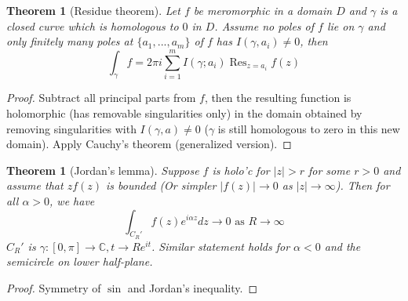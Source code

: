 \documentclass{article}
\theoremstyle{definition}
\theoremstyle{remark}
\theoremstyle{plain}
\newtheorem{thm}[defn]{Theorem}
\newcommand{\CC}{\mathbb{C}}
\begin{document}
\begin{thm}[Residue theorem]
    Let $f$ be meromorphic in a domain $D$ and $\gamma$ is a closed curve which is homologous to $0$ in $D$. Assume no poles of $f$ lie on $\gamma$ and only finitely many poles at $\{a_1,...,a_m\}$ of $f$ has $I(\gamma,a_i)\neq 0$, then
    \[\int_\gamma f=2\pi i\sum_{i=1}^m I(\gamma;a_i)\operatorname{Res}_{z=a_i}f(z)\]
\end{thm}
\begin{proof}
    Subtract all principal parts from $f$, then the resulting function is holomorphic (has removable singularities only) in the domain obtained by removing singularities with $I(\gamma,a)\neq 0$ ($\gamma$ is still homologous to zero in this new domain). Apply Cauchy's theorem (generalized version).
\end{proof}
\begin{thm}[Jordan's lemma]
    Suppose $f$ is holo'c for $|z|>r$ for some $r>0$ and assume that $zf(z)$ is bounded (Or simpler $|f(z)|\to 0$ as $|z|\to\infty$). Then for all $\alpha>0$, we have
    \[\int_{C_R'}f(z)e^{i\alpha z}dz\to 0\text{ as } R\to\infty\]
    $C_R'$ is $\gamma:[0,\pi]\to\CC, t\to Re^{it}$. Similar statement holds for $\alpha<0$ and the semicircle on lower half-plane.
\end{thm}
\begin{proof}
    Symmetry of $\sin$ and Jordan's inequality.
\end{proof}
\end{document}
